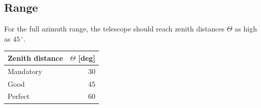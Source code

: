 \documentclass[11pt,a4paper,oneside,titlepage]{article}
\begin{document}
\subsection{Range}
%
For the full azimuth range, the telescope should reach zenith distances $\Theta$ as high as $45\,^\circ$. 
%
\begin{table}[H]
    \begin{center}
        \begin{tabular}{lr}
            Zenith distance & $\Theta$ [deg]\\
            \toprule
            Mandatory & 30\\
            Good      & 45\\
            Perfect   & 60\\
            \bottomrule
        \end{tabular}
    \end{center}
\end{table}
\end{document}

